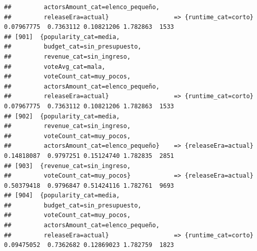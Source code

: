 \documentclass[
]{article}
\begin{document}
\begin{verbatim}
##         actorsAmount_cat=elenco_pequeño,                                                                                        
##         releaseEra=actual}                  => {runtime_cat=corto}               0.07967775  0.7363112 0.10821206 1.782863  1533
## [901]  {popularity_cat=media,                                                                                                   
##         budget_cat=sin_presupuesto,                                                                                             
##         revenue_cat=sin_ingreso,                                                                                                
##         voteAvg_cat=mala,                                                                                                       
##         voteCount_cat=muy_pocos,                                                                                                
##         actorsAmount_cat=elenco_pequeño,                                                                                        
##         releaseEra=actual}                  => {runtime_cat=corto}               0.07967775  0.7363112 0.10821206 1.782863  1533
## [902]  {popularity_cat=media,                                                                                                   
##         revenue_cat=sin_ingreso,                                                                                                
##         voteCount_cat=muy_pocos,                                                                                                
##         actorsAmount_cat=elenco_pequeño}    => {releaseEra=actual}               0.14818087  0.9797251 0.15124740 1.782835  2851
## [903]  {revenue_cat=sin_ingreso,                                                                                                
##         voteCount_cat=muy_pocos}            => {releaseEra=actual}               0.50379418  0.9796847 0.51424116 1.782761  9693
## [904]  {popularity_cat=media,                                                                                                   
##         budget_cat=sin_presupuesto,                                                                                             
##         voteCount_cat=muy_pocos,                                                                                                
##         actorsAmount_cat=elenco_pequeño,                                                                                        
##         releaseEra=actual}                  => {runtime_cat=corto}               0.09475052  0.7362682 0.12869023 1.782759  1823

\end{verbatim}
\end{document}
